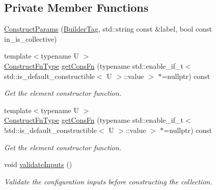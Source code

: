 \subsection*{Private Member Functions}
\begin{DoxyCompactItemize}
\item 
\hyperlink{structvt_1_1vrt_1_1collection_1_1param_1_1_construct_params_a455f516dd75d0ddb407c1b066b9ec87e}{Construct\+Params} (\hyperlink{structvt_1_1vrt_1_1collection_1_1param_1_1_construct_params_1_1_builder_tag}{Builder\+Tag}, std\+::string const \&label, bool const in\+\_\+is\+\_\+collective)
\item 
{\footnotesize template$<$typename U $>$ }\\\hyperlink{structvt_1_1vrt_1_1collection_1_1param_1_1_construct_params_a7ad7bdf4220701e54b485f45e08b1736}{Construct\+Fn\+Type} \hyperlink{structvt_1_1vrt_1_1collection_1_1param_1_1_construct_params_ae6f31177ec60c98d598b6df9eda8d06a}{get\+Cons\+Fn} (typename std\+::enable\+\_\+if\+\_\+t$<$ std\+::is\+\_\+default\+\_\+constructible$<$ U $>$\+::value $>$ $\ast$=nullptr) const
\begin{DoxyCompactList}\small\item\em Get the element constructor function. \end{DoxyCompactList}\item 
{\footnotesize template$<$typename U $>$ }\\\hyperlink{structvt_1_1vrt_1_1collection_1_1param_1_1_construct_params_a7ad7bdf4220701e54b485f45e08b1736}{Construct\+Fn\+Type} \hyperlink{structvt_1_1vrt_1_1collection_1_1param_1_1_construct_params_ab0d89974dff84686c16173b93881c0e8}{get\+Cons\+Fn} (typename std\+::enable\+\_\+if\+\_\+t$<$!std\+::is\+\_\+default\+\_\+constructible$<$ U $>$\+::value $>$ $\ast$=nullptr) const
\begin{DoxyCompactList}\small\item\em Get the element constructor function. \end{DoxyCompactList}\item 
void \hyperlink{structvt_1_1vrt_1_1collection_1_1param_1_1_construct_params_a6290541ab30870daf78af1984ddc164d}{validate\+Inputs} ()
\begin{DoxyCompactList}\small\item\em Validate the configuration inputs before constructing the collection. \end{DoxyCompactList}\end{DoxyCompactItemize}
